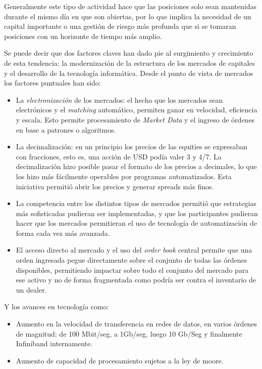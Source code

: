 Generalmente este tipo de actividad hace que las posiciones solo sean
mantenidas durante el mismo día en que son abiertas, por lo que implica la
necesidad de un capital importante o una gestión de riesgo más profunda que si
se tomaran posiciones con un horizonte de tiempo más amplio.

Se puede decir que dos factores claves han dado pie al surgimiento y
crecimiento de esta tendencia: la modernización de la estructura de los
mercados de capitales y el desarrollo de la tecnología informática. Desde el
punto de vista de mercados los factores puntuales han sido:
\begin{itemize}
 \item La \emph{electronización} de los mercados: el hecho que los mercados
 sean electrónicos y el \emph{matching} automático, permiten ganar en
 velocidad, eficiencia y escala. Esto permite procesamiento de \emph{Market
 Data} y el ingreso de órdenes en base a patrones o algoritmos. 
 \item La decimalización: en un principio los precios de las equities se
 expresaban con fracciones, esto es, una acción de USD podía valer 3 y 4/7. La
 decimalización hizo posible pasar el formato de los precios a decimales, lo
 que los hizo más fácilmente operables por programas automatizados. Esta
 iniciativa permitió abrir los precios y generar spreads más finos.
 \item La competencia entre los distintos tipos de mercados permitió que
 estrategias más sofisticadas pudieran ser implementadas, y que los
 participantes pudieran hacer que los mercados permitieran el uso de tecnología
 de automatización de forma cada vez más avanzada.
 \item El acceso directo al mercado y el uso del \emph{order book} central
 permite que una orden ingresada pegue directamente sobre el conjunto de todas
 las órdenes disponibles, permitiendo impactar sobre todo el conjunto del
 mercado para ese activo y no de forma fragmentada como podría ser contra el
 inventario de un dealer.
\end{itemize}

Y los avances en tecnología como:
\begin{itemize}
 \item Aumento en la velocidad de transferencia en redes de datos, en varios
órdenes de magnitud: de 100 Mbit/seg, a 1Gb/seg, luego 10 Gb/Seg y finalmente
Infiniband internamente.
 \item Aumento de capacidad de procesamiento sujetos a la ley de moore.
\end{itemize}

